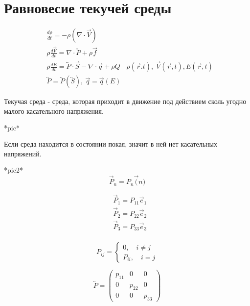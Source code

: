 \section{Равновесие текучей среды}
\begin{align*}
  &\frac{d\rho}{dt} = -\rho(\nabla \cdot \vec{V}) \\
  &\rho \frac{d \vec{V}}{dt} = \nabla \cdot \overleftrightarrow{P} + \rho \vec{f} \\
  & \rho \frac{d E}{dt} = \overleftrightarrow{P} \cdot \vec{S} - \nabla \cdot \vec{q} + \rho Q
  &\rho(\vec{r}. t),\ \vec{V}(\vec{r}, t), E(\vec{r}, t)\\ 
  &\overleftrightarrow{P} = \overleftrightarrow{P} (\overleftrightarrow{S}),\ \vec{q} = \vec{q}(E)
\end{align*}

\begin{defn}
  Текучая среда - среда, которая приходит в движение под действием сколь
  угодно малого касательного напряжения.
\end{defn}

*pic*

\begin{note}
  Если среда находится в состоянии покая, значит в ней нет касательных напряжений.
\end{note}

*pic2*
\[
  \vec{P}_n = P_n \vec(n)
\]

\begin{align*}
  &\vec{P}_1 = P_{11} \vec{e}_1 \\
  &\vec{P}_2 = P_{22} \vec{e}_2 \\
  &\vec{P}_3 = P_{33} \vec{e}_3 \\
\end{align*}

\[
  P_{ij} = \begin{cases}
    0, \quad i \neq j \\
    P_{ii}, \quad i = j
  \end{cases}
\]

\[
  \overleftrightarrow{P} =
  \begin{pmatrix}
    p_{11} &0 &0 \\
    0 &p_{22} &0 \\
    0 &0 &p_{33}
  \end{pmatrix}
\]

